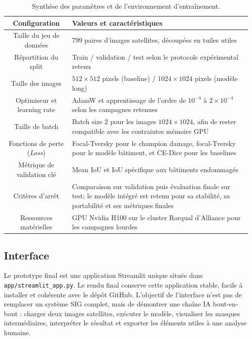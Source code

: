 \documentclass[french,12pt]{article}
\begin{document}
\begin{table}[H]
    \centering
    \begin{tabular}{|c|>{\centering\arraybackslash}m{9.5cm}|}
        \hline
        \textbf{Configuration} & \textbf{Valeurs et caractéristiques} \\
        \hline
        Taille du jeu de données & 2 799 paires d'images satellites, découpées en tuiles utiles \\ \hline
        Répartition du split & Train / validation / test selon le protocole expérimental retenu \\ \hline
        Taille des images & $512 \times 512$ pixels (baseline) / $1024 \times 1024$ pixels (modèle long) \\ \hline
        Optimiseur et learning rate & AdamW et apprentissage de l'ordre de $10^{-4}$ à $2 \times 10^{-4}$ selon les campagnes retenues \\ \hline
        Taille de batch & Batch size 2 pour les images $1024 \times 1024$, afin de rester compatible avec les contraintes mémoire GPU \\ \hline
        Fonctions de perte (\textit{Loss}) & Focal-Tversky pour le champion damage, focal-Tversky pour le modèle bâtiment, et CE-Dice pour les baselines \cite{dice_loss,tversky_loss,focal_tversky} \\ \hline
        Métrique de validation clé & Mean IoU et IoU spécifique aux bâtiments endommagés \\ \hline
        Critères d'arrêt & Comparaison sur validation puis évaluation finale sur test; le modèle intégré est retenu pour sa stabilité, sa portabilité et ses métriques finales \\ \hline
        Ressources matérielles & GPU Nvidia H100 sur le cluster Rorqual d'Alliance pour les campagnes lourdes \\ \hline
    \end{tabular}
    \caption{Synthèse des paramètres et de l'environnement d'entraînement.}
    \label{tab:parametres_entrainement}
\end{table}

\subsection{Interface}

Le prototype final est une application Streamlit unique située dans \texttt{app/streamlit\_app.py}. Le rendu final conserve cette application stable, facile à installer et cohérente avec le dépôt GitHub. L'objectif de l'interface n'est pas de remplacer un système SIG complet, mais de démontrer une chaîne IA bout-en-bout : charger deux images satellites, exécuter le modèle, visualiser les masques intermédiaires, interpréter le résultat et exporter les éléments utiles à une analyse humaine.
\end{document}
